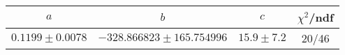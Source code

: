 \begin{tabular}{c|c|c|c}
$a$ & $b$ & $c$ & $\chi^2$/ndf \\
\hline
$0.1199\pm0.0078$ & $-328.866823\pm165.754996$ & $15.9\pm7.2$ & 20/46
\end{tabular}
